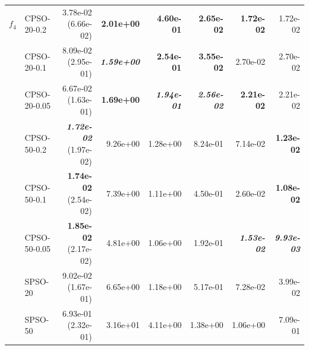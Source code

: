 \documentclass[a4paper,twoside]{article}
\begin{document}
\begin{table}
\begin{tabular}{|| l | l | r | r | r | r | r | r ||}
$f_4$   &  CPSO-20-0.2    &  3.78e-02 (6.66e-02)               &  {\bf 2.01e+00}         &  {\bf 4.60e-01}         &  {\bf 2.65e-02}         &  {\bf 1.72e-02}         &  1.72e-02 \\
    \cline{2-8} 
        &  CPSO-20-0.1    &  8.09e-02 (2.95e-01)               &  {\bf \emph{1.59e+00}}  &  {\bf 2.54e-01}         &  {\bf 3.55e-02}         &  2.70e-02               &  2.70e-02 \\
    \cline{2-8}
        &  CPSO-20-0.05   &  6.67e-02 (1.63e-01)               &  {\bf 1.69e+00}         &  {\bf \emph{1.94e-01}}  &  {\bf \emph{2.56e-02}}  &  {\bf 2.21e-02}         &  2.21e-02 \\
    \cline{2-8}
        &  CPSO-50-0.2    &  {\bf \emph{1.72e-02}} (1.97e-02)  &  9.26e+00               &  1.28e+00               &  8.24e-01               &  7.14e-02               &  {\bf 1.23e-02} \\
    \cline{2-8}
        &  CPSO-50-0.1    &  {\bf 1.74e-02} (2.54e-02)         &  7.39e+00               &  1.11e+00               &  4.50e-01               &  2.60e-02               &  {\bf 1.08e-02} \\
    \cline{2-8}
        &  CPSO-50-0.05   &  {\bf 1.85e-02} (2.17e-02)         &  4.81e+00               &  1.06e+00               &  1.92e-01               &  {\bf \emph{1.53e-02}}  &  {\bf \emph{9.93e-03}} \\
\hline \hline
        &  SPSO-20        &  9.02e-02 (1.67e-01)               &  6.65e+00               &  1.18e+00               &  5.17e-01               &  7.28e-02               &  3.99e-02 \\
    \cline{2-8}
        &  SPSO-50        &  6.93e-01 (2.32e-01)               &  3.16e+01               &  4.11e+00               &  1.38e+00               &  1.06e+00               &  7.09e-01 \\

\hline \hline \hline



\end{tabular}
\end{table}
\end{document}

